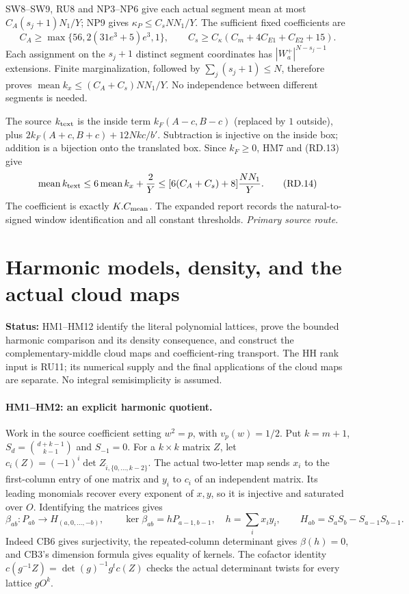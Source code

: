 \documentclass[11pt,a4paper]{article}
\numberwithin{equation}{section}
\theoremstyle{remark}\newtheorem{remark}[theorem]{Remark}
\newcommand{\status}[1]{\textbf{Status:} #1}
\begin{document}
SW8--SW9, RU8 and NP3--NP6 give each actual segment mean at most
$C_A(s_j+1)N_1/Y$; NP9 gives $\kappa_P\le C_sNN_1/Y$.
The sufficient fixed coefficients are
\[
 C_A\ge\max\{56,2(31e^3+5)e^3,1\},\qquad
 C_s\ge C_\kappa(C_m+4C_{E1}+C_{E2}+15).
\]
Each assignment on the $s_j+1$ distinct segment coordinates has
$|W_a^+|^{N-s_j-1}$ extensions. Finite marginalization, followed by
$\sum_j(s_j+1)\le N$, therefore proves
$\operatorname{mean}k_x\le(C_A+C_s)NN_1/Y$.
No independence between different segments is needed.

The source $k_{\rm text}$ is the inside term $k_F(A-c,B-c)$
(replaced by $1$ outside), plus $2k_F(A+c,B+c)+12Nkc/b'$.
Subtraction is injective on the inside box; addition is a bijection
onto the translated box. Since $k_F\ge0$, HM7 and (RD.13) give
\[
 \operatorname{mean}k_{\rm text}
 \le6\operatorname{mean}k_x+\frac2Y
 \le[6(C_A+C_s)+8]\frac{NN_1}{Y}.
 \tag{RD.14}
\]
The coefficient is exactly $K.C_{\rm mean}$. The expanded report records
the natural-to-signed window identification and all constant thresholds.
\noindent\textit{Primary source route.}\cite{coarse-rank-lower}


\section{Harmonic models, density, and the actual cloud maps}
\label{sec:harmonic-model}

\status{HM1--HM12 identify the literal polynomial lattices, prove the
bounded harmonic comparison and its density consequence, and construct
the complementary-middle cloud maps and coefficient-ring transport.
The HH rank input is RU11; its numerical supply and the final applications
of the cloud maps are separate. No integral semisimplicity is assumed.}

\paragraph{HM1--HM2: an explicit harmonic quotient.}
Work in the source coefficient setting $w^2=p$, with $v_p(w)=1/2$.
Put $k=m+1$, $S_d=\binom{d+k-1}{k-1}$ and $S_{-1}=0$.
For a $k\times k$ matrix $Z$, let
$c_i(Z)=(-1)^i\det Z_{\widehat i,\{0,\ldots,k-2\}}$.
The actual two-letter map sends $x_i$ to the first-column entry
of one matrix and $y_i$ to $c_i$ of an independent matrix.
Its leading monomials recover every exponent of $x,y$, so it is
injective and saturated over $O$. Identifying the matrices gives
\[
 \beta_{ab}:P_{ab}\longrightarrow H_{(a,0,\ldots,-b)},\qquad
 \ker\beta_{ab}=hP_{a-1,b-1},\quad h=\sum_i x_i y_i,
 \qquad H_{ab}=S_aS_b-S_{a-1}S_{b-1}.                    \tag{HM.1}
\]
Indeed CB6 gives surjectivity, the repeated-column determinant gives
$\beta(h)=0$, and CB3's dimension formula gives equality of kernels.
The cofactor identity
$c(g^{-1}Z)=\det(g)^{-1}g^t c(Z)$ checks the actual determinant twists
for every lattice $gO^k$.
\end{document}
